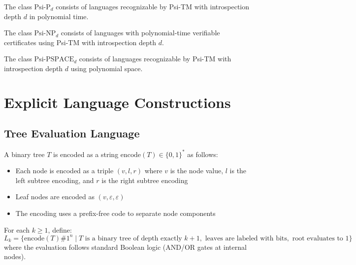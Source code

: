 \begin{definition}
The class $\text{Psi-P}_d$ consists of languages recognizable by Psi-TM with introspection depth $d$ in polynomial time.
\end{definition}

\begin{definition}
The class $\text{Psi-NP}_d$ consists of languages with polynomial-time verifiable certificates using Psi-TM with introspection depth $d$.
\end{definition}

\begin{definition}
The class $\text{Psi-PSPACE}_d$ consists of languages recognizable by Psi-TM with introspection depth $d$ using polynomial space.
\end{definition}

\section{Explicit Language Constructions}

\subsection{Tree Evaluation Language}

\begin{definition}
A binary tree $T$ is encoded as a string $\text{encode}(T) \in \{0,1\}^*$ as follows:
\begin{itemize}
\item Each node is encoded as a triple $(v, l, r)$ where $v$ is the node value, $l$ is the left subtree encoding, and $r$ is the right subtree encoding
\item Leaf nodes are encoded as $(v, \varepsilon, \varepsilon)$
\item The encoding uses a prefix-free code to separate node components
\end{itemize}
\end{definition}

\begin{definition}
For each $k \geq 1$, define:
$$L_k = \{\text{encode}(T)\#1^n \mid T \text{ is a binary tree of depth exactly } k+1, \text{ leaves are labeled with bits}, \text{ root evaluates to } 1\}$$
where the evaluation follows standard Boolean logic (AND/OR gates at internal nodes).
\end{definition}

